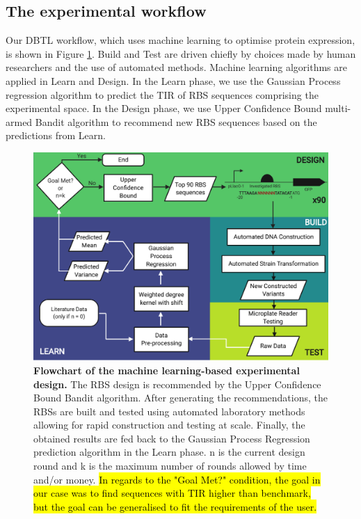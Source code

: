 \documentclass{article}
\begin{document}
\subsection{The experimental workflow}
\label{sec:dbtl-workflow}

Our DBTL workflow, which uses machine learning to optimise protein expression, is shown in Figure \ref{fig: Flowchart}.
Build and Test are driven chiefly by choices made by human researchers and the use of automated methods.
Machine learning algorithms are applied in Learn and Design.
In the Learn phase, we use the Gaussian Process regression algorithm to predict the TIR of RBS sequences comprising the experimental space.
In the Design phase, we use Upper Confidence Bound multi-armed Bandit algorithm to recommend new RBS sequences based on the predictions from Learn.\\

\begin{figure}[h]
    \centering
    \includegraphics[scale=0.7]{plots/Main_Paper/flowchart.pdf}
    \caption{\textbf{Flowchart of the machine learning-based experimental design.} The RBS design is recommended by the Upper Confidence Bound Bandit algorithm. After generating the recommendations, the RBSs are built and tested using automated laboratory methods allowing for rapid construction and testing at scale. Finally, the obtained results are fed back to the Gaussian Process Regression prediction algorithm in the Learn phase. n is the current design round and k is the maximum number of rounds allowed by time and/or money. \hl{In regards to the "Goal Met?" condition, the goal in our case was to find sequences with TIR higher than benchmark, but the goal can be generalised to fit the requirements of the user.} }
    \label{fig: Flowchart}
\end{figure}
\end{document}
